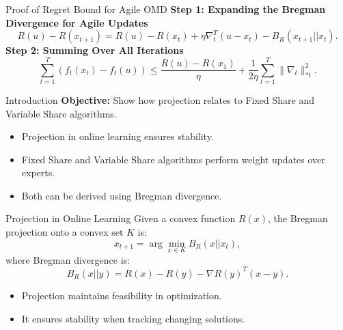 \documentclass{beamer}
\begin{document}
\begin{frame}{Proof of Regret Bound for Agile OMD}
    \textbf{Step 1: Expanding the Bregman Divergence for Agile Updates}
    \begin{equation}
        R(u) - R(x_{t+1}) = R(u) - R(x_t) + \eta \nabla_t^T (u - x_t) - B_R(x_{t+1} || x_t).
    \end{equation}
    \textbf{Step 2: Summing Over All Iterations}
    \begin{equation}
        \sum_{t=1}^{T} (f_t(x_t) - f_t(u)) \leq \frac{R(u) - R(x_1)}{\eta} + \frac{1}{2\eta} \sum_{t=1}^{T} \| \nabla_t \|_{*t}^2.
    \end{equation}
\end{frame}


\begin{frame}{Introduction}
    \textbf{Objective:} Show how projection relates to Fixed Share and Variable Share algorithms.
    \begin{itemize}
        \item Projection in online learning ensures stability.
        \item Fixed Share and Variable Share algorithms perform weight updates over experts.
        \item Both can be derived using Bregman divergence.
    \end{itemize}
\end{frame}

\begin{frame}{Projection in Online Learning}
    Given a convex function $R(x)$, the Bregman projection onto a convex set $K$ is:
    \begin{equation}
        x_{t+1} = \arg\min_{x \in K} B_R(x || x_t),
    \end{equation}
    where Bregman divergence is:
    \begin{equation}
        B_R(x || y) = R(x) - R(y) - \nabla R(y)^T (x - y).
    \end{equation}
    \begin{itemize}
        \item Projection maintains feasibility in optimization.
        \item It ensures stability when tracking changing solutions.
    \end{itemize}
\end{frame}
\end{document}
